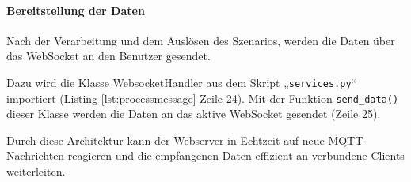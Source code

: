 \documentclass[12pt, letterpaper]{article}
\begin{document}
  \paragraph{Bereitstellung der Daten}
  \par \textbf{}
  \par Nach der Verarbeitung und dem Auslösen des Szenarios, werden die Daten über das WebSocket an den Benutzer gesendet. 
  \par Dazu wird die Klasse WebsocketHandler aus dem Skript „\texttt{services.py}“ importiert (Listing \ref{lst:processmessage} Zeile 24). Mit der Funktion \texttt{send\_data()} dieser Klasse werden die Daten an das aktive WebSocket gesendet (Zeile 25).
  \par Durch diese Architektur kann der Webserver in Echtzeit auf neue MQTT-Nachrichten reagieren und die empfangenen Daten effizient an verbundene Clients weiterleiten.
\end{document}
